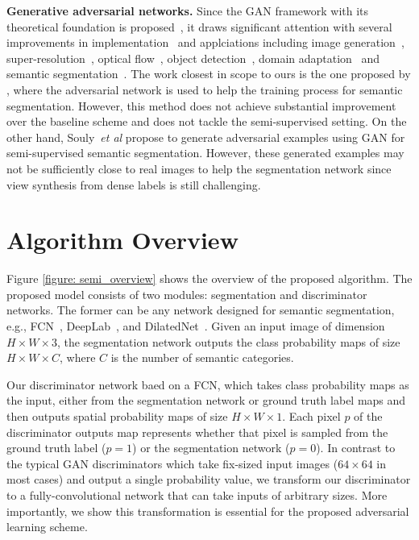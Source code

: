 \documentclass{bmvc2k}
\def\etal{\emph{et al}\bmvaOneDot}
\begin{document}
	{\flushleft \bf Generative adversarial networks.}
	Since the GAN framework with its theoretical foundation is proposed~\cite{gan}, it draws significant attention with several improvements in implementation~\cite{dcgan,denton2015deep, arjovsky2017wasserstein, mao2016multi, berthelot2017began} and applciations
	including image generation~\cite{dcgan}, super-resolution~\cite{srgan,lai2017deep}, optical flow~\cite{lai2017semi}, object detection~\cite{fastarcnn}, domain adaptation~\cite{fcnsinthewild,Tsai_adaptseg_2018,Hoffman_cycada2017} and semantic segmentation~\cite{luc2016semantic, souly2017semi}.
	The work closest in scope to ours is the one proposed by \cite{luc2016semantic}, where the adversarial network is used to help the training process for semantic segmentation. 
	However, this method does not achieve substantial improvement over the baseline scheme 
	and does not tackle the semi-supervised setting.
	On the other hand, Souly~\etal \cite{souly2017semi} propose to generate adversarial examples using GAN for semi-supervised semantic segmentation. 
	However, these generated examples may not be sufficiently close to real images to help the segmentation network since view synthesis from dense labels is still challenging.
	
	\vspace{-2mm}
	\section{Algorithm Overview}
	\vspace{-2mm}
	
	Figure \ref{figure: semi_overview} shows the overview of the proposed algorithm.
	The proposed model consists of two modules: segmentation and discriminator networks.
	The former can be any network designed for semantic segmentation, e.g., FCN~\cite{fcn}, DeepLab~\cite{deeplab}, and DilatedNet~\cite{dilated}.
	Given an input image of dimension $H \times W \times 3$, the segmentation network outputs the class probability maps of size $H \times W \times C$, where $C$ is the number of semantic categories.
	
	Our discriminator network baed on a FCN, which takes class probability maps as the input, either from the segmentation network or ground truth label maps and then outputs spatial probability maps of size $H \times W \times 1$.
	Each pixel $p$ of the discriminator outputs map represents whether that pixel is sampled from the ground truth label ($p=1$) or the segmentation network ($p=0$).
	In contrast to the typical GAN discriminators which take fix-sized input images ($64 \times 64$ in most cases) and output a single probability value, we transform our discriminator to a fully-convolutional network that can take inputs of arbitrary sizes.
	More importantly, we show this transformation is essential for the proposed adversarial learning scheme.
	
\end{document}
